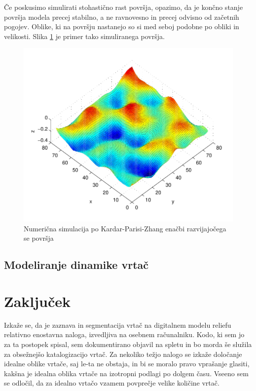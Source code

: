 \documentclass[a4paper, oneside, 12pt]{book}
\begin{document}
            Če poskusimo simulirati stohastično rast površja, opazimo, da je končno stanje površja modela precej stabilno, a ne ravnovesno in precej odvisno od začetnih pogojev. Oblike, ki na površju nastanejo so si med seboj podobne po obliki in velikosti. Slika \ref{fig:KPZ-numericno} je primer tako simuliranega površja.

            \begin{figure}[H]
              \begin{center}
                \includegraphics[width=14cm]{slike/KPZ-numericno}
              \end{center}
              \caption{Numerična simulacija po Kardar-Parisi-Zhang enačbi razvijajočega se površja}
              \label{fig:KPZ-numericno}
            \end{figure}


            \section{Modeliranje dinamike vrtač}




            \chapter{Zaključek}

            Izkaže se, da je zaznava in segmentacija vrtač na digitalnem modelu reliefu relativno enostavna naloga, izvedljiva na osebnem računalniku. Kodo, ki sem jo za ta postopek spisal, sem dokumentirano objavil na spletu in bo morda še služila za obsežnejšo katalogizacijo vrtač.
            Za nekoliko težjo nalogo se izkaže določanje idealne oblike vrtače, saj le-ta ne obstaja, in bi se moralo pravo vprašanje glasiti, kakšna je idealna oblika vrtače na izotropni podlagi po dolgem času. Vseeno sem se odločil, da za idealno vrtačo vzamem povprečje velike količine vrtač.
\end{document}

